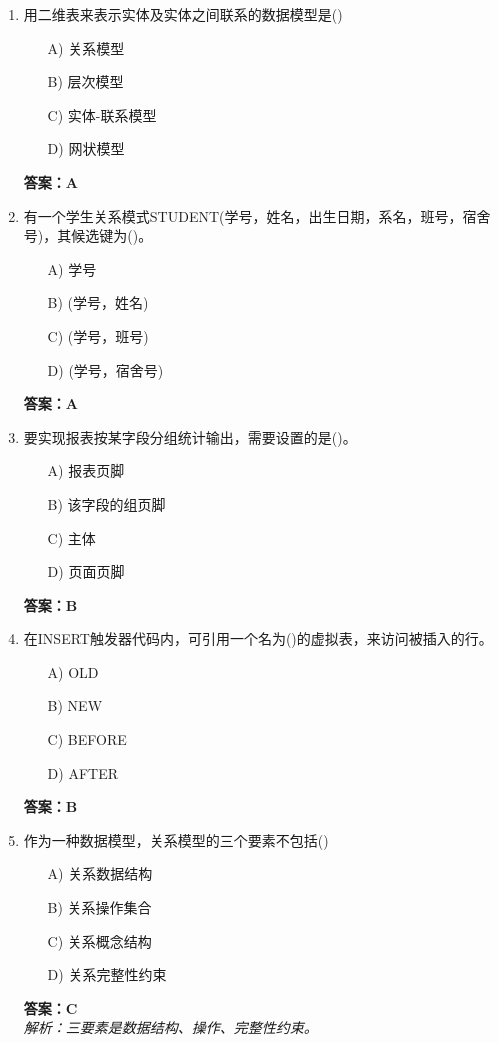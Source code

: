\documentclass[a4paper,12pt]{article}
\begin{document}
\begin{enumerate}[label=\arabic*.]
\item 用二维表来表示实体及实体之间联系的数据模型是()
\begin{itemize}
    \item[A)] 关系模型
    \item[B)] 层次模型
    \item[C)] 实体-联系模型
    \item[D)] 网状模型
\end{itemize}
\textbf{答案：A}

\item 有一个学生关系模式STUDENT(学号，姓名，出生日期，系名，班号，宿舍号)，其候选键为()。
\begin{itemize}
    \item[A)] 学号
    \item[B)] (学号，姓名)
    \item[C)] (学号，班号)
    \item[D)] (学号，宿舍号)
\end{itemize}
\textbf{答案：A}

\item 要实现报表按某字段分组统计输出，需要设置的是()。
\begin{itemize}
    \item[A)] 报表页脚
    \item[B)] 该字段的组页脚
    \item[C)] 主体
    \item[D)] 页面页脚
\end{itemize}
\textbf{答案：B}

\item 在INSERT触发器代码内，可引用一个名为()的虚拟表，来访问被插入的行。
\begin{itemize}
    \item[A)] OLD
    \item[B)] NEW
    \item[C)] BEFORE
    \item[D)] AFTER
\end{itemize}
\textbf{答案：B}

\item 作为一种数据模型，关系模型的三个要素不包括()
\begin{itemize}
    \item[A)] 关系数据结构
    \item[B)] 关系操作集合
    \item[C)] 关系概念结构
    \item[D)] 关系完整性约束
\end{itemize}
\textbf{答案：C} \\
\textit{解析：三要素是数据结构、操作、完整性约束。}


\end{enumerate}
\end{document}
